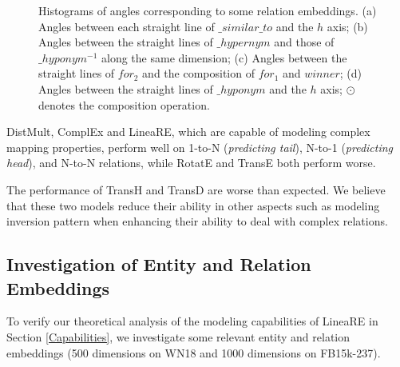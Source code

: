 \documentclass[conference]{IEEEtran}
\begin{document}
\begin{figure*}[t]
	\centering
	\caption{
		Histograms of angles corresponding to some relation embeddings. (a) Angles between each straight line of $\_similar\_to$ and the $h$ axis; (b) Angles between the straight lines of  $\_hypernym$ and those of $\_hyponym^{-1}$ along the same dimension; (c) Angles between the straight lines of $for_2$ and the composition of $for_1$ and $winner$; (d) Angles between the straight lines of $\_hyponym$ and the $h$ axis; $\odot$ denotes the composition operation.
	}
	\label{RelationEmbedding}
\end{figure*}
DistMult, ComplEx and LineaRE, which are capable of modeling complex mapping properties, perform well on 1-to-N (\textit{predicting tail}), N-to-1 (\textit{predicting head}), and N-to-N relations, while RotatE and TransE both perform worse.

The performance of TransH and TransD are worse than expected. We believe that these two models reduce their ability in other aspects such as modeling inversion pattern when enhancing their ability to deal with complex relations.

\subsection{Investigation of Entity and Relation Embeddings}
To verify our theoretical analysis of the modeling capabilities of LineaRE in Section \ref{Capabilities}, we investigate some relevant entity and relation embeddings (500 dimensions on WN18 and 1000 dimensions on FB15k-237).
\end{document}
